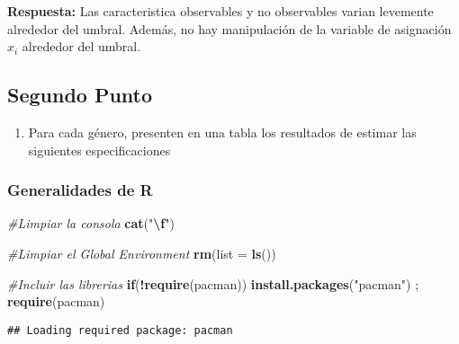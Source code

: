 \documentclass[
]{article}
\newenvironment{Shaded}{\begin{snugshade}}{\end{snugshade}}
\newcommand{\AttributeTok}[1]{\textcolor[rgb]{0.13,0.29,0.53}{#1}}
\newcommand{\CommentTok}[1]{\textcolor[rgb]{0.56,0.35,0.01}{\textit{#1}}}
\newcommand{\ControlFlowTok}[1]{\textcolor[rgb]{0.13,0.29,0.53}{\textbf{#1}}}
\newcommand{\FunctionTok}[1]{\textcolor[rgb]{0.13,0.29,0.53}{\textbf{#1}}}
\newcommand{\NormalTok}[1]{#1}
\newcommand{\SpecialCharTok}[1]{\textcolor[rgb]{0.81,0.36,0.00}{\textbf{#1}}}
\newcommand{\StringTok}[1]{\textcolor[rgb]{0.31,0.60,0.02}{#1}}
\providecommand{\tightlist}{%
  \setlength{\itemsep}{0pt}\setlength{\parskip}{0pt}}
\begin{document}
\textbf{Respuesta:} Las caracteristica observables y no observables
varian levemente alrededor del umbral. Además, no hay manipulación de la
variable de asignación \(x_i\) alrededor del umbral.

\subsection{Segundo Punto}\label{segundo-punto}

\begin{enumerate}
\def\labelenumi{\arabic{enumi}.}
\setcounter{enumi}{1}
\tightlist
\item
  Para cada género, presenten en una tabla los resultados de estimar las
  siguientes especificaciones
\end{enumerate}

\subsubsection{Generalidades de R}\label{generalidades-de-r}

\begin{Shaded}
\begin{Highlighting}[]
\CommentTok{\#Limpiar la consola}
\FunctionTok{cat}\NormalTok{(}\StringTok{"}\SpecialCharTok{\textbackslash{}f}\StringTok{"}\NormalTok{)}
\end{Highlighting}
\end{Shaded}

\newpage{}

\begin{Shaded}
\begin{Highlighting}[]
\CommentTok{\#Limpiar el Global Environment}
\FunctionTok{rm}\NormalTok{(}\AttributeTok{list =} \FunctionTok{ls}\NormalTok{())}

\CommentTok{\#Incluir las librerias}
\ControlFlowTok{if}\NormalTok{(}\SpecialCharTok{!}\FunctionTok{require}\NormalTok{(pacman)) }\FunctionTok{install.packages}\NormalTok{(}\StringTok{"pacman"}\NormalTok{) ; }\FunctionTok{require}\NormalTok{(pacman)}
\end{Highlighting}
\end{Shaded}

\begin{verbatim}
## Loading required package: pacman
\end{verbatim}
\end{document}
